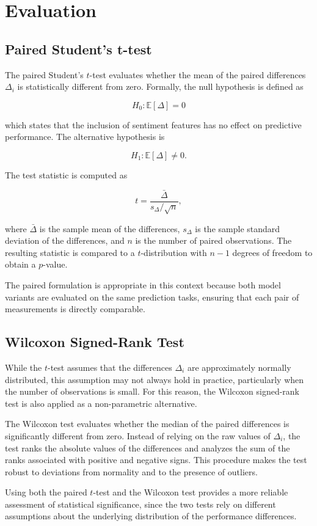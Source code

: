 \chapter{Evaluation}
\label{appendix:evaluation}

\section{Paired Student's t-test}

The paired Student's $t$-test evaluates whether the mean of the paired differences $\Delta_i$ is statistically different from zero. Formally, the null hypothesis is defined as

\[
H_0 : \mathbb{E}[\Delta] = 0
\]

which states that the inclusion of sentiment features has no effect on predictive performance. The alternative hypothesis is

\[
H_1 : \mathbb{E}[\Delta] \neq 0 .
\]

The test statistic is computed as

\[
t = \frac{\bar{\Delta}}{s_\Delta / \sqrt{n}},
\]

where $\bar{\Delta}$ is the sample mean of the differences, $s_\Delta$ is the sample standard deviation of the differences, and $n$ is the number of paired observations. The resulting statistic is compared to a $t$-distribution with $n-1$ degrees of freedom to obtain a $p$-value.

The paired formulation is appropriate in this context because both model variants are evaluated on the same prediction tasks, ensuring that each pair of measurements is directly comparable.

\section{Wilcoxon Signed-Rank Test}

While the $t$-test assumes that the differences $\Delta_i$ are approximately normally distributed, this assumption may not always hold in practice, particularly when the number of observations is small. For this reason, the Wilcoxon signed-rank test is also applied as a non-parametric alternative.

The Wilcoxon test evaluates whether the median of the paired differences is significantly different from zero. Instead of relying on the raw values of $\Delta_i$, the test ranks the absolute values of the differences and analyzes the sum of the ranks associated with positive and negative signs. This procedure makes the test robust to deviations from normality and to the presence of outliers.

Using both the paired $t$-test and the Wilcoxon test provides a more reliable assessment of statistical significance, since the two tests rely on different assumptions about the underlying distribution of the performance differences.

